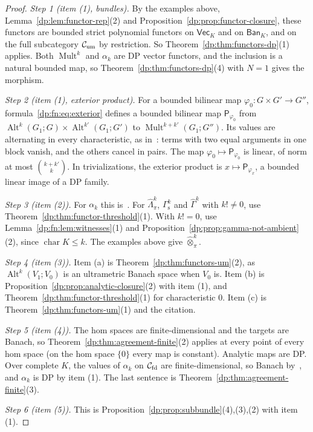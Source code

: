 \documentclass[11pt]{amsart}
\theoremstyle{definition}
\theoremstyle{remark}
\numberwithin{equation}{section}
\newcommand{\Alt}{\operatorname{Alt}}
\newcommand{\Mult}{\operatorname{Mult}}
\newcommand{\cC}{\mathcal{C}}
\theoremstyle{plain}
\theoremstyle{definition}
\theoremstyle{plain}
\newcommand{\hot}{\mathbin{\widehat\otimes}}
\newcommand{\hLambda}{\widehat\Lambda}
\newcommand{\hGamma}{\widehat\Gamma}
\begin{document}
\begin{proof}
\emph{Step 1 (item (1), bundles).} By the examples above, Lemma~\ref{dp:lem:functor-rep}(2) and Proposition~\ref{dp:prop:functor-closure}, these functors are bounded strict polynomial functors on $\mathsf{Vec}_K$ and on $\mathsf{Ban}_K$, and on the full subcategory $\cC_{\rm um}$ by restriction. So Theorem~\ref{dp:thm:functors-dp}(1) applies. Both $\Mult^k$ and $\alpha_k$ are DP vector functors, and the inclusion is a natural bounded map, so Theorem~\ref{dp:thm:functors-dp}(4) with $N=1$ gives the morphism.

\emph{Step 2 (item (1), exterior product).} For a bounded bilinear map $\varphi_0\colon G\times G'\to G''$, formula~\eqref{dp:fn:eq:exterior} defines a bounded bilinear map $\mathsf P_{\varphi_0}$ from $\Alt^k(G_1;G)\times\Alt^{k'}(G_1;G')$ to $\Mult^{k+k'}(G_1;G'')$. Its values are alternating in every characteristic, as in~\cite[proof of Theorem~10.7, Step~2]{I}: terms with two equal arguments in one block vanish, and the others cancel in pairs. The map $\varphi_0\mapsto\mathsf P_{\varphi_0}$ is linear, of norm at most $\binom{k+k'}k$. In trivializations, the exterior product is $x\mapsto\mathsf P_{\varphi_x}$, a bounded linear image of a DP family.

\emph{Step 3 (item (2)).} For $\alpha_k$ this is~\cite[Corollary~7.3]{I}. For $\hLambda^k_\pi$, $\Gamma^k_{\mathrm s}$ and $\hGamma^k$ with $k!\ne0$, use Theorem~\ref{dp:thm:functor-threshold}(1). With $k!=0$, use Lemma~\ref{dp:fn:lem:witnesses}(1) and Proposition~\ref{dp:prop:gamma-not-ambient}(2), since $\operatorname{char}K\le k$. The examples above give $\hot^k_\pi$.

\emph{Step 4 (item (3)).} Item (a) is Theorem~\ref{dp:thm:functors-um}(2), as $\Alt^k(V_1;V_0)$ is an ultrametric Banach space when $V_0$ is. Item (b) is Proposition~\ref{dp:prop:analytic-closure}(2) with item (1), and Theorem~\ref{dp:thm:functor-threshold}(1) for characteristic $0$. Item (c) is Theorem~\ref{dp:thm:functors-um}(1) and the citation.

\emph{Step 5 (item (4)).} The hom spaces are finite-dimensional and the targets are Banach, so Theorem~\ref{dp:thm:agreement-finite}(2) applies at every point of every hom space (on the hom space $\{0\}$ every map is constant). Analytic maps are DP. Over complete $K$, the values of $\alpha_k$ on $\cC_{\rm fd}$ are finite-dimensional, so Banach by~\cite[Lemma~A.3]{I}, and $\alpha_k$ is DP by item (1). The last sentence is Theorem~\ref{dp:thm:agreement-finite}(3).

\emph{Step 6 (item (5)).} This is Proposition~\ref{dp:prop:subbundle}(4),(3),(2) with item (1).
\end{proof}
\end{document}
